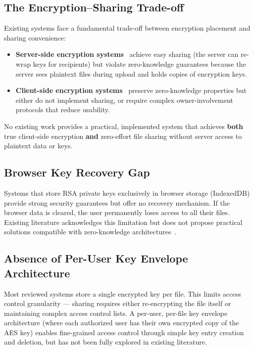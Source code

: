 \documentclass[conference]{IEEEtran}
\begin{document}
\subsection{The Encryption--Sharing Trade-off}

Existing systems face a fundamental trade-off between encryption placement and sharing convenience:

\begin{itemize}
    \item \textbf{Server-side encryption systems}~\cite{hassan2023enhanced, kumar2024hybrid} achieve easy sharing (the server can re-wrap keys for recipients) but violate zero-knowledge guarantees because the server sees plaintext files during upload and holds copies of encryption keys.
    \item \textbf{Client-side encryption systems}~\cite{patil2024client, singh2023hybrid} preserve zero-knowledge properties but either do not implement sharing, or require complex owner-involvement protocols that reduce usability.
\end{itemize}

No existing work provides a practical, implemented system that achieves \textbf{both} true client-side encryption \textbf{and} zero-effort file sharing without server access to plaintext data or keys.

\subsection{Browser Key Recovery Gap}

Systems that store RSA private keys exclusively in browser storage (IndexedDB) provide strong security guarantees but offer no recovery mechanism. If the browser data is cleared, the user permanently loses access to all their files. Existing literature acknowledges this limitation but does not propose practical solutions compatible with zero-knowledge architectures~\cite{patil2024client}.

\subsection{Absence of Per-User Key Envelope Architecture}

Most reviewed systems store a single encrypted key per file. This limits access control granularity --- sharing requires either re-encrypting the file itself or maintaining complex access control lists. A per-user, per-file key envelope architecture (where each authorized user has their own encrypted copy of the AES key) enables fine-grained access control through simple key entry creation and deletion, but has not been fully explored in existing literature.
\end{document}
